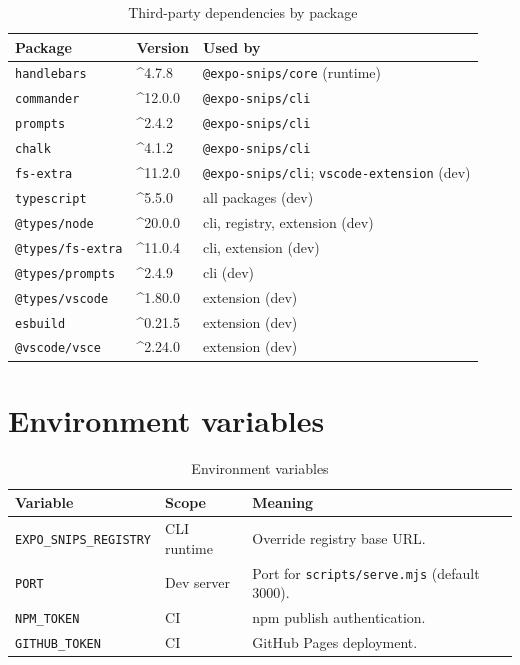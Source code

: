 \begin{longtable}{p{4.6cm}p{2.8cm}p{6.8cm}}
\caption{Third-party dependencies by package}\\
\toprule
\textbf{Package} & \textbf{Version} & \textbf{Used by} \\
\midrule

\texttt{handlebars} & \^{}4.7.8 & \texttt{@expo-snips/core} (runtime) \\
\texttt{commander} & \^{}12.0.0 & \texttt{@expo-snips/cli} \\
\texttt{prompts} & \^{}2.4.2 & \texttt{@expo-snips/cli} \\
\texttt{chalk} & \^{}4.1.2 & \texttt{@expo-snips/cli} \\
\texttt{fs-extra} & \^{}11.2.0 & \texttt{@expo-snips/cli};
\texttt{vscode-extension} (dev) \\
\texttt{typescript} & \^{}5.5.0 & all packages (dev) \\
\texttt{@types/node} & \^{}20.0.0 & cli, registry, extension (dev) \\
\texttt{@types/fs-extra} & \^{}11.0.4 & cli, extension (dev) \\
\texttt{@types/prompts} & \^{}2.4.9 & cli (dev) \\
\texttt{@types/vscode} & \^{}1.80.0 & extension (dev) \\
\texttt{esbuild} & \^{}0.21.5 & extension (dev) \\
\texttt{@vscode/vsce} & \^{}2.24.0 & extension (dev) \\
\bottomrule
\end{longtable}

\section{Environment variables}

\begin{longtable}{p{4.2cm}p{2.4cm}p{7.6cm}}
\caption{Environment variables}\\
\toprule
\textbf{Variable} & \textbf{Scope} & \textbf{Meaning} \\
\midrule

\texttt{EXPO\_SNIPS\_REGISTRY} & CLI runtime & Override registry base URL. \\
\texttt{PORT} & Dev server & Port for \texttt{scripts/serve.mjs} (default 3000). \\
\texttt{NPM\_TOKEN} & CI & npm publish authentication. \\
\texttt{GITHUB\_TOKEN} & CI & GitHub Pages deployment. \\
\bottomrule
\end{longtable}

